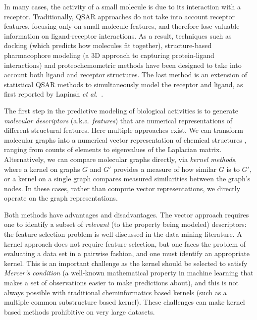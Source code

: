 \documentclass{sig-alternate}
\begin{document}
In many cases, the activity of a small molecule is due to its
interaction with a receptor. Traditionally, QSAR \cite{Hansch:1962vn,
 Free:1964ys} approaches do not take into account receptor features,
focusing only on small molecule features, and therefore lose valuable
information on ligand-receptor interactions. As a result, techniques
such as docking (which predicts how molecules fit together),
structure-based pharmacophore modeling (a 3D approach to capturing protein-ligand
interactions) and proteochemometric methods have been designed to take
into account both ligand and receptor structures. The last method is
an extension of statistical QSAR methods to simultaneously
model the receptor and ligand, as first reported by Lapinsh \textit{et
 al.}~\cite{lapinsh2001}.

The first step in the predictive modeling of biological activities is
to generate \emph{molecular descriptors} (a.k.a. \emph{features}) that
are numerical representations of different structural features. Here
multiple approaches exist. We can transform molecular graphs into a
numerical vector representation of chemical structures
\cite{todeschini2000}, ranging from counts of elements to eigenvalues
of the Laplacian matrix.  Alternatively, we can compare molecular
graphs directly, via \emph{kernel methods}, where a kernel on graphs
$G$ and $G'$ provides a measure of how similar $G$ is to $G'$, or a
kernel on a single graph compares measured similarities between the
graph's nodes. In these cases, rather than compute vector
representations, we directly operate on the graph representations.

Both methods have advantages and disadvantages. The vector approach
requires one to identify a subset of \emph{relevant} (to the property
being modeled) descriptors: the feature selection problem is
well discussed in the data mining literature. A kernel approach
does not require feature selection, but one faces the problem of
evaluating a data set in a pairwise fashion, and one must
identify an appropriate kernel. This is an important challenge as the
kernel should be selected to satisfy \emph{Mercer's condition} (a
well-known mathematical property in machine learning that makes a set
of observations easier to make predictions about), and this is not
always possible with traditional cheminformatics based kernels (such
as a multiple common substructure based kernel). These challenges can
make kernel based methods prohibitive on very large datasets.
\end{document}
